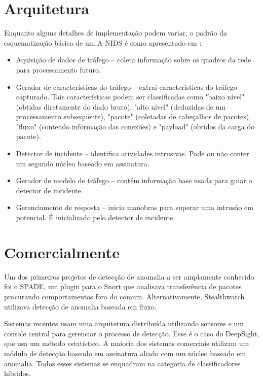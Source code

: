  \section{Arquitetura}
    Enquanto alguns detalhes de implementação podem variar, o padrão da esquematização básica de um A-NIDS
    é como apresentado em \cite{catania12}:
    \begin{itemize}
        \item Aquisição de dados de tráfego -- coleta informação sobre os quadros da rede para processamento futuro.
        \item Gerador de características do tráfego -- extrai características do tráfego capturado. Tais características
         podem ser classificadas como "baixo nível" (obtidas diretamente do dado bruto), "alto nível" (deduzidas de um
         processamento subsequente), "pacote" (coletadas de cabeçalhos de pacotes), "fluxo" (contendo informação das
         conexões) e "payload" (obtidos da carga do pacote).
        \item Detector de incidente -- identifica atividades intrusivas. Pode ou não conter um segundo núcleo baseado
        em assinatura.
        \item Gerador de modelo de tráfego -- contém informação base usada para guiar o detector de incidente.
        \item Gerenciamento de resposta -- inicia manobras para superar uma intrusão em potencial. É inicializado pelo
        detector de incidente.
    \end{itemize}

 \section{Comercialmente}
 Um dos primeiros projetos de detecção de anomalia a ser amplamente conhecido foi o SPADE, um plugin para o Snort que
 analisava transferência de pacotes procurando comportamentos fora do comum. Alternativamente, Stealthwatch utilizava
 detecção de anomalia baseada em fluxo.
 \par Sistemas recentes usam uma arquitetura distribuída utilizando sensores e um
 console central para gerenciar o processo de detecção. Esse é o caso do DeepSight, que usa um método estatístico.
 A maioria dos sistemas comerciais utilizam um módulo de detecção baseado em assinatura aliado com um núcleo baseado em
 anomalia. Todos esses sistemas se enquadram na categoria de classificadores híbridos.